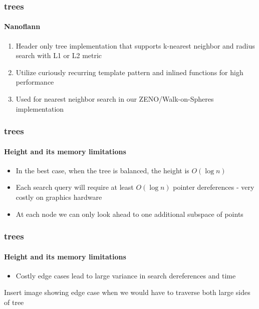 \begin{frame}
  \frametitle{\kd trees}
  \framesubtitle{Nanoflann}

  \begin{enumerate}
    \item Header only \kd tree implementation that supports k-nearest neighbor and radius search with 
      L1 or L2 metric
    \item Utilize curiously recurring template pattern and inlined functions for high performance
    \item Used for nearest neighbor search in our ZENO/Walk-on-Spheres implementation 
  \end{enumerate}

\end{frame}


\begin{frame}
  \frametitle{\kd trees}
  \framesubtitle{Height and its memory limitations}

  \begin{itemize}
    \item In the best case, when the tree is balanced, the height is $O(\log n)$
    \item Each search query will require at least $O(\log n )$ pointer dereferences - very costly on graphics 
      hardware
    \item At each node we can only look ahead to one additional subspace of points
  \end{itemize}
\end{frame}

\begin{frame}
  \frametitle{\kd trees}
  \framesubtitle{Height and its memory limitations}

  \begin{itemize}
    \item Costly edge cases lead to large variance in search dereferences and time
  \end{itemize}

  Insert image showing edge case when we would have to traverse both large sides of tree
\end{frame}
